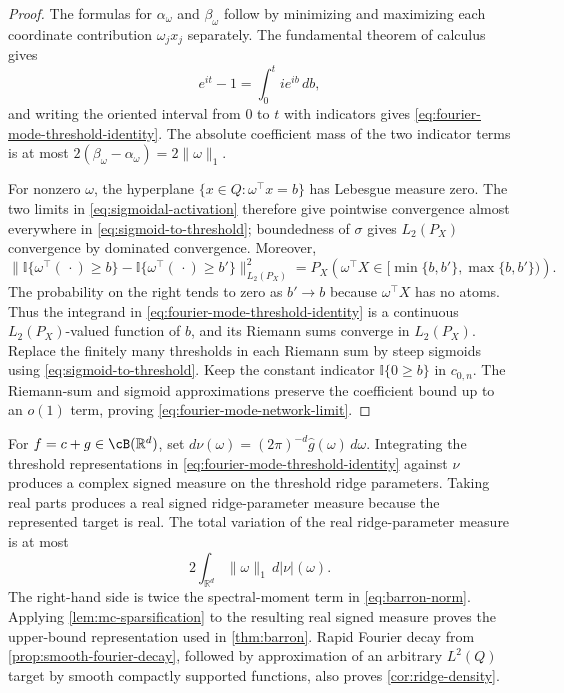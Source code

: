 \documentclass[11pt,twoside]{article}
\newcommand{\I}{\mathbb I}
\newcommand{\R}{\mathbb R}
\theoremstyle{definition}
\theoremstyle{remark}
\begin{document}
\begin{proof}
The formulas for $\alpha_\omega$ and $\beta_\omega$ follow by minimizing and
maximizing each coordinate contribution $\omega_jx_j$ separately. The
fundamental theorem of calculus gives
\begin{equation}
 e^{it}-1=\int_0^t ie^{ib}\,db,
 \label{eq:complex-exponential-calculus}
\end{equation}
and writing the oriented interval from $0$ to $t$ with indicators gives
\cref{eq:fourier-mode-threshold-identity}. The absolute coefficient mass of
the two indicator terms is at most
$2(\beta_\omega-\alpha_\omega)=2\|\omega\|_1$.

For nonzero $\omega$, the hyperplane
$\{x\in Q:\omega^\top x=b\}$ has Lebesgue measure zero. The two limits in
\cref{eq:sigmoidal-activation} therefore give pointwise convergence almost
everywhere in \cref{eq:sigmoid-to-threshold}; boundedness of $\sigma$ gives
$L_2(P_X)$ convergence by dominated convergence. Moreover,
\begin{equation}
 \bigl\|\I\{\omega^\top(\,\cdot)\geq b\}
 -\I\{\omega^\top(\,\cdot)\geq b'\}\bigr\|_{L_2(P_X)}^2
 =P_X\!\left(\omega^\top X\in
 [\min\{b,b'\},\max\{b,b'\})\right).
 \label{eq:threshold-l2-continuity}
\end{equation}
The probability on the right tends to zero as $b'\to b$ because
$\omega^\top X$ has no atoms.
Thus the integrand in \cref{eq:fourier-mode-threshold-identity} is a
continuous $L_2(P_X)$-valued function of $b$, and its Riemann sums converge
in $L_2(P_X)$. Replace the finitely many thresholds in each Riemann sum by
steep sigmoids using \cref{eq:sigmoid-to-threshold}. Keep the constant
indicator $\I\{0\geq b\}$ in $c_{0,n}$. The Riemann-sum and sigmoid
approximations preserve the coefficient bound up to an $o(1)$ term, proving
\cref{eq:fourier-mode-network-limit}.
\end{proof}

For \(f=c+g\in\cB(\R^d)\), set
$d\nu(\omega)=(2\pi)^{-d}\widehat g(\omega)\,d\omega$. Integrating the
threshold representations in \cref{eq:fourier-mode-threshold-identity}
against $\nu$ produces a complex signed measure on the threshold ridge
parameters. Taking real parts produces a real signed ridge-parameter measure
because the represented target is real. The total variation of the real
ridge-parameter measure is at most
\begin{equation}
 2\int_{\R^d}\|\omega\|_1\,d|\nu|(\omega).
 \label{eq:fourier-to-ridge-variation-bound}
\end{equation}
The right-hand side is twice the spectral-moment term in
\cref{eq:barron-norm}. Applying \cref{lem:mc-sparsification} to the resulting
real signed measure proves the upper-bound representation used in
\cref{thm:barron}. Rapid Fourier decay from
\cref{prop:smooth-fourier-decay}, followed by approximation of an arbitrary
$L^2(Q)$ target by smooth compactly supported functions, also proves
\cref{cor:ridge-density}.
\end{document}
